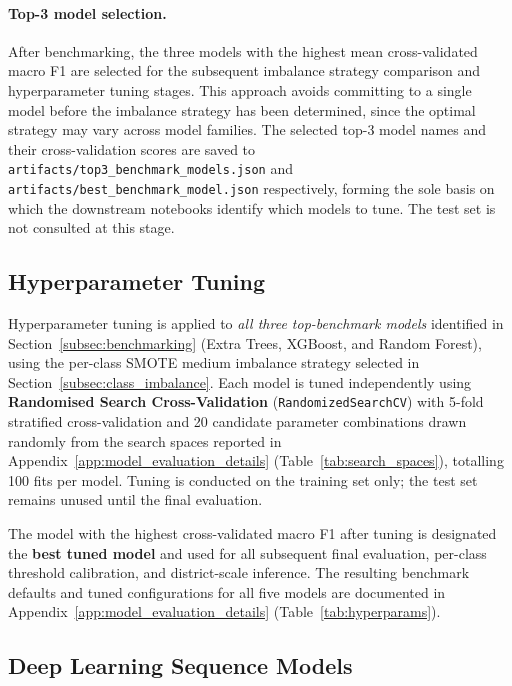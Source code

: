 \paragraph{Top-3 model selection.}
After benchmarking, the three models with the highest mean cross-validated
macro F1 are selected for the subsequent imbalance strategy comparison and
hyperparameter tuning stages. This approach avoids committing to a single
model before the imbalance strategy has been determined, since the optimal
strategy may vary across model families. The selected top-3 model names
and their cross-validation scores are saved to
\texttt{artifacts/top3\_benchmark\_models.json} and
\texttt{artifacts/best\_benchmark\_model.json} respectively, forming the
sole basis on which the downstream notebooks identify which models to tune.
The test set is not consulted at this stage.


\subsection{Hyperparameter Tuning}
\label{subsec:tuning}

Hyperparameter tuning is applied to \emph{all three top-benchmark models}
identified in Section~\ref{subsec:benchmarking} (Extra Trees, XGBoost,
and Random Forest), using the per-class SMOTE medium imbalance strategy
selected in Section~\ref{subsec:class_imbalance}. Each model is tuned
independently using \textbf{Randomised Search Cross-Validation}
(\texttt{RandomizedSearchCV}) with 5-fold stratified cross-validation
and 20 candidate parameter combinations drawn randomly from the search
spaces reported in Appendix~\ref{app:model_evaluation_details}
(Table~\ref{tab:search_spaces}), totalling 100 fits per model. Tuning is
conducted on the training set only; the test set remains unused until the
final evaluation.

The model with the highest cross-validated macro F1 after tuning is
designated the \textbf{best tuned model} and used for all subsequent
final evaluation, per-class threshold calibration, and district-scale
inference. The resulting benchmark defaults and tuned configurations for
all five models are documented in Appendix~\ref{app:model_evaluation_details}
(Table~\ref{tab:hyperparams}).

\subsection{Deep Learning Sequence Models}
\label{subsec:deep_learning}

